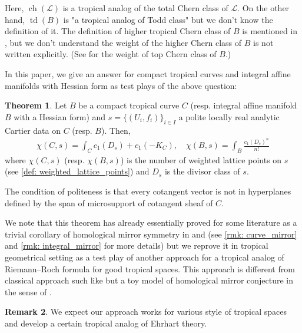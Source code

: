 \documentclass[a4paper,dvipdfmx,reqno,12pt]{amsart}
\theoremstyle{definition}
\newtheorem{Thm}{Theorem}[section]
\newtheorem{Rmk}[Thm]{Remark}
\newcommand{\mcal}[1]{\mathcal{#1}}%
\newcommand{\opn}[1]{\operatorname{#1}}
\numberwithin{equation}{section}
\begin{document}
Here, $\opn{ch}(\mcal{L})$ is a tropical analog of 
the total Chern class of $\mcal{L}$.
On the other hand, $\opn{td}(B)$ is
"a tropical analog of Todd class"
but we don't know the definition of it. 
The definition of higher tropical Chern class of $B$
is mentioned in \cite[5.3]{mikhalkinTropicalGeometryIts2006},
but we don't understand the weight of the higher Chern class 
of $B$ is not written explicitly.
(See \cite[Definition 3.20]{shawTropicalSurfaces2015a} for 
the weight of top Chern class of $B$.)


In this paper, we give an answer for compact tropical curves 
and integral affine manifolds with Hessian form
as test plays of the above question:

\begin{Thm} \label{thm: main}
Let $B$ be a compact tropical curve $C$ (resp. integral 
affine manifold $B$
with a Hessian form) and $s=\{(U_i,f_i)\}_{i\in I}$ a polite 
locally real analytic 
Cartier data on $C$ (resp. $B$). Then,
\begin{align}
\chi(C,s)=\int_C c_1(D_s)+c_1(-K_C), \quad \chi(B,s)=\int_B \frac{c_1(D_s)^{n}}{n!}
\end{align}
where $\chi(C,s)$ (resp. $\chi(B,s)$) is the number of weighted lattice
points on $s$ (see \cref{def: weighted_lattice_points}) and $D_s$ is the divisor class of $s$.
\end{Thm}

The condition of politeness is that every cotangent vector 
is not in hyperplanes defined by the span of microsupport of
cotangent sheaf of $C$. 


We note that this theorem has already essentially proved for some
literature as a trivial corollary of homological mirror symmetry 
in \cite{MR4301560} and \cite{auroux2022lagrangian} (see \cref{rmk: curve_mirror} and \cref{rmk: integral_mirror} 
for more details) but we reprove it in tropical  
geometrical setting as a test play of another approach 
for a tropical analog of Riemann--Roch formula for 
good tropical spaces. This approach is different
from classical approach such like 
\cite{MR2355607,gathmannRiemannRochTheoremTropical2008a,mikhalkinTropicalCurvesTheir2008a} but
a toy model of homological mirror conjecture in the sense
of \cite[{}]{auroux2022lagrangian}.

\begin{Rmk}
We expect our approach works for various style 
of tropical spaces and develop a certain tropical 
analog of Ehrhart theory. 
\end{Rmk}
\end{document}
